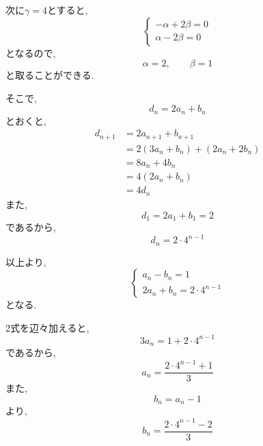 \begin{enumerate}[label=(\arabic*),parsep=3pt]
          次に$\gamma=4$とすると,
          \[
          \begin{cases}
            -\alpha+2\beta=0\\
            \alpha-2\beta=0
          \end{cases}
          \]
          となるので,
          \[
            \alpha=2,\qquad\beta=1
          \]
          と取ることができる.

          そこで,
          \[
            d_n=2a_n+b_n
          \]
          とおくと,
          \begin{align*}
            d_{n+1}
              &=2a_{n+1}+b_{n+1}\\
              &=2(3a_n+b_n)+(2a_n+2b_n)\\
              &=8a_n+4b_n\\
              &=4(2a_n+b_n)\\
              &=4d_n
          \end{align*}
          また,
          \[
            d_1=2a_1+b_1=2
          \]
          であるから,
          \[
            d_n=2\cdot4^{n-1}
          \]

          以上より,
          \[
          \begin{cases}
            a_n-b_n=1\\
            2a_n+b_n=2\cdot4^{n-1}
          \end{cases}
          \]
          となる.

          2式を辺々加えると,
          \[
            3a_n=1+2\cdot4^{n-1}
          \]
          であるから,
          \[
            a_n=\frac{2\cdot4^{n-1}+1}{3}
          \]
          また,
          \[
            b_n=a_n-1
          \]
          より,
          \[
            b_n=\frac{2\cdot4^{n-1}-2}{3}
          \]
    \end{enumerate}

